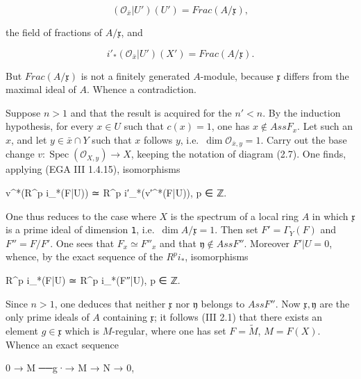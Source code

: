 \documentclass[
]{article}
\newenvironment{Shaded}{}{}
\newcommand{\NormalTok}[1]{#1}
\begin{document}
\[
(\mathcal{O}_{\bar{x}}|U')(U') = Frac(A/\mathfrak{x}),
\]

the field of fractions of \(A/\mathfrak{x}\), and

\[
i'_{*}(\mathcal{O}_{\bar{x}}|U')(X') = Frac(A/\mathfrak{x}).
\]

But \(Frac(A/\mathfrak{x})\) is not a finitely generated \(A\)-module,
because \(\mathfrak{x}\) differs from the maximal ideal of \(A\). Whence
a contradiction.

Suppose \(n > 1\) and that the result is acquired for the \(n' < n\). By
the induction hypothesis, for every \(x \in U\) such that \(c(x) = 1\),
one has \(x \notin Ass F_{x}\). Let such an \(x\), and let
\(y \in \bar{x} \cap Y\) such that \(x\) follows \(y\),
i.e.~\(\dim \mathcal{O}_{\bar{x}, y} = 1\). Carry out the base change
\(v : \operatorname{Spec}(\mathcal{O}_{X, y}) \to X\), keeping the
notation of diagram (2.7). One finds, applying (EGA III 1.4.15),
isomorphisms

\begin{Shaded}
\begin{Highlighting}[]
\NormalTok{v\^{}*(R\^{}p i\_*(F|U)) ≃ R\^{}p i′\_*(v′\^{}*(F|U)),    p ∈ ℤ.}
\end{Highlighting}
\end{Shaded}

One thus reduces to the case where \(X\) is the spectrum of a local ring
\(A\) in which \(\mathfrak{x}\) is a prime ideal of dimension
\texttt{1}, i.e.~\(\dim A/\mathfrak{x} = 1\). Then set
\(F' = \Gamma_{Y}(F)\) and \(F'' = F/F'\). One sees that
\(F_{x} \simeq F''_{x}\) and that \(\mathfrak{y} \notin Ass F''\).
Moreover \(F'|U = 0\), whence, by the exact sequence of the
\(R^{p} i_{*}\), isomorphisms

\begin{Shaded}
\begin{Highlighting}[]
\NormalTok{R\^{}p i\_*(F|U) ≃ R\^{}p i\_*(F″|U),    p ∈ ℤ.}
\end{Highlighting}
\end{Shaded}

Since \(n > 1\), one deduces that neither \(\mathfrak{x}\) nor
\(\mathfrak{y}\) belongs to \(Ass F''\). Now
\(\mathfrak{x}, \mathfrak{y}\) are the only prime ideals of \(A\)
containing \(\mathfrak{x}\); it follows (III 2.1) that there exists an
element \(g \in \mathfrak{x}\) which is \(M\)-regular, where one has set
\(F = \tilde{M}\), \(M = F(X)\). Whence an exact sequence

\begin{Shaded}
\begin{Highlighting}[]
\NormalTok{0 → M ──g·→ M → N → 0,}
\end{Highlighting}
\end{Shaded}
\end{document}
